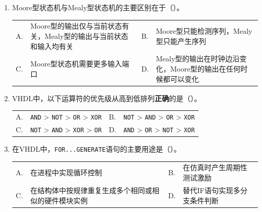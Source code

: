 \begin{enumerate}[label=\arabic*.]
\vspace{0.8cm}

\item Moore型状态机与Mealy型状态机的主要区别在于（\quad）。

\vspace{0.3cm}

\begin{tabular}{@{}lp{}@{\qquad}lp{}@{}}
A. & Moore型的输出仅与当前状态有关，Mealy型的输出与当前状态和输入均有关 &
B. & Moore型只能检测序列，Mealy型只能产生序列 \\
C. & Moore型状态机需要更多输入端口 &
D. & Mealy型的输出在时钟边沿变化，Moore型的输出在任何时候都可以变化 \\
\end{tabular}

\vspace{0.8cm}

\item VHDL中，以下运算符的优先级从高到低排列\textbf{正确}的是（\quad）。

\vspace{0.3cm}

\begin{tabular}{@{}lp{}@{\qquad}lp{}@{}}
A. & \texttt{AND} > \texttt{NOT} > \texttt{OR} > \texttt{XOR} &
B. & \texttt{NOT} > \texttt{AND} > \texttt{OR} > \texttt{XOR} \\
C. & \texttt{NOT} > \texttt{AND} > \texttt{XOR} > \texttt{OR} &
D. & \texttt{AND} > \texttt{OR} > \texttt{NOT} > \texttt{XOR} \\
\end{tabular}

\vspace{0.8cm}

\item 在VHDL中，\texttt{FOR...GENERATE}语句的主要用途是（\quad）。

\vspace{0.3cm}

\begin{tabular}{@{}lp{}@{\qquad}lp{}@{}}
A. & 在进程中实现循环控制 &
B. & 在仿真时产生周期性测试激励 \\
C. & 在结构体中按规律重复生成多个相同或相似的硬件模块实例 &
D. & 替代IF语句实现多分支条件判断 \\
\end{tabular}

\end{enumerate}

